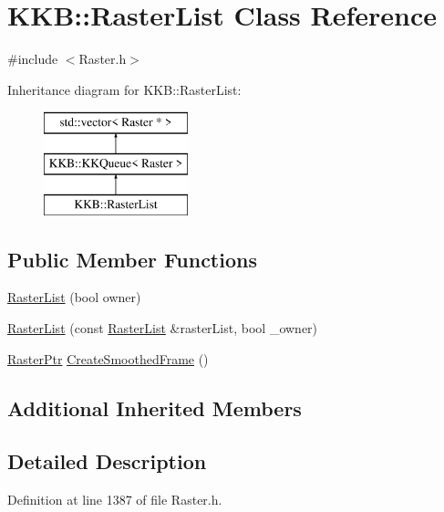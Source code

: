 \hypertarget{class_k_k_b_1_1_raster_list}{}\section{K\+KB\+:\+:Raster\+List Class Reference}
\label{class_k_k_b_1_1_raster_list}


{\ttfamily \#include $<$Raster.\+h$>$}

Inheritance diagram for K\+KB\+:\+:Raster\+List\+:\begin{figure}[H]
\begin{center}
\leavevmode
\includegraphics[height=3.000000cm]{class_k_k_b_1_1_raster_list}
\end{center}
\end{figure}
\subsection*{Public Member Functions}
\begin{DoxyCompactItemize}
\item 
\hyperlink{class_k_k_b_1_1_raster_list_a3f72041983afaa927389a17b6f02a1d8}{Raster\+List} (bool owner)
\item 
\hyperlink{class_k_k_b_1_1_raster_list_a4dbbd5f4dd147a02fff4b93502c081c5}{Raster\+List} (const \hyperlink{class_k_k_b_1_1_raster_list}{Raster\+List} \&raster\+List, bool \+\_\+owner)
\item 
\hyperlink{namespace_k_k_b_a80d46bd24db644a022c863bce8ae3633}{Raster\+Ptr} \hyperlink{class_k_k_b_1_1_raster_list_af78097714e1b932b443fccfe7f8baf56}{Create\+Smoothed\+Frame} ()
\end{DoxyCompactItemize}
\subsection*{Additional Inherited Members}


\subsection{Detailed Description}


Definition at line 1387 of file Raster.\+h.



